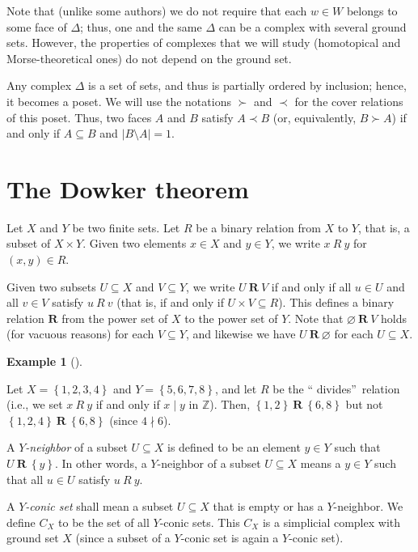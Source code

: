 \documentclass[numbers=enddot,12pt,final,onecolumn,notitlepage]{scrartcl}%
\theoremstyle{definition}
\newtheorem{exam}[theo]{Example}
\newenvironment{example}[1][]
{\begin{exam}[#1]\begin{leftbar}}
{\end{leftbar}\end{exam}}
\newenvironment{vershort}{}{}
\begin{document}
Note that (unlike some authors) we do not require that each $w\in W$ belongs
to some face of $\Delta$; thus, one and the same $\Delta$ can be a complex
with several ground sets. However, the properties of complexes that we will
study (homotopical and Morse-theoretical ones) do not depend on the ground set.

Any complex $\Delta$ is a set of sets, and thus is partially ordered by
inclusion; hence, it becomes a poset. We will use the notations $\succ$ and
$\prec$ for the cover relations of this poset. Thus, two faces $A$ and $B$
satisfy $A\prec B$ (or, equivalently, $B\succ A$) if and only if $A\subseteq
B$ and $\left\vert B\setminus A\right\vert =1$.

\section{The Dowker theorem}

Let $X$ and $Y$ be two finite sets. Let $R$ be a binary relation from $X$ to
$Y$, that is, a subset of $X\times Y$. Given two elements $x\in X$ and $y\in
Y$, we write $x\ R\ y$ for $\left(  x,y\right)  \in R$.

Given two subsets $U\subseteq X$ and $V\subseteq Y$, we write $U\ \mathbf{R}%
\ V$ if and only if all $u\in U$ and all $v\in V$ satisfy $u\ R\ v$ (that is,
if and only if $U\times V\subseteq R$). This defines a binary relation
$\mathbf{R}$ from the power set of $X$ to the power set of $Y$. Note that
$\varnothing\ \mathbf{R}\ V$ holds (for vacuous reasons) for each $V\subseteq
Y$, and likewise we have $U\ \mathbf{R}\ \varnothing$ for each $U\subseteq X$.

\begin{example}
\label{exa.dowker.1}Let $X=\left\{  1,2,3,4\right\}  $ and $Y=\left\{
5,6,7,8\right\}  $, and let $R$ be the \textquotedblleft
divides\textquotedblright\ relation (i.e., we set $x\ R\ y$ if and only if
$x\mid y$ in $\mathbb{Z}$). Then, $\left\{  1,2\right\}  \ \mathbf{R}%
\ \left\{  6,8\right\}  $ but not $\left\{  1,2,4\right\}  \ \mathbf{R}%
\ \left\{  6,8\right\}  $ (since $4\nmid6$).
\end{example}

A $Y$\emph{-neighbor} of a subset $U\subseteq X$ is defined to be an element
$y\in Y$ such that $U\ \mathbf{R}\ \left\{  y\right\}  $. In other words, a
$Y$-neighbor of a subset $U\subseteq X$ means a $y\in Y$ such that all $u\in
U$ satisfy $u\ R\ y$.

\begin{vershort}
A $Y$\emph{-conic set} shall mean a subset $U\subseteq X$ that is empty or has
a $Y$-neighbor. We define $C_{X}$ to be the set of all $Y$-conic sets. This
$C_{X}$ is a simplicial complex with ground set $X$ (since a subset of a
$Y$-conic set is again a $Y$-conic set).
\end{vershort}
\end{document}
